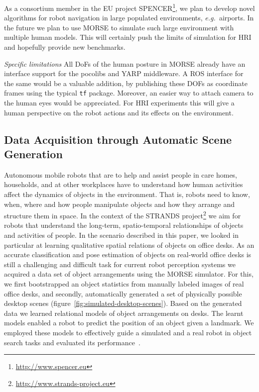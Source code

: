 \documentclass{llncs}
\newcommand{\eg}{{\textit{e.g.~}}}
\begin{document}
As a consortium member in the EU project
SPENCER\footnote{\url{http://www.spencer.eu}}, we plan to develop novel
algorithms for robot navigation in large populated environments, \eg airports.
In the future we plan to use MORSE to simulate such large environment with
multiple human models. This will certainly push the limits of simulation for HRI
and hopefully provide new benchmarks.

\emph{Specific limitations} All DoFs of the human posture in MORSE already have an
interface support for the {\sc pocolibs} and YARP middleware. A ROS interface
for the same would be a valuable addition, by publishing these DOFs
as coordinate frames using the typical {\tt tf} package. Moreover, an easier
way to attach camera to the human eyes would be appreciated. For HRI experiments
this will give a human perspective on the robot actions and its effects on the
environment.


\subsection{Data Acquisition through Automatic Scene Generation}
\label{sc:generation}

Autonomous mobile robots that are to help and assist people in care homes,
households, and at other workplaces have to understand how human activities
affect the dynamics of objects in the environment. That is, robots need to know,
when, where and how people manipulate objects and how they arrange and structure
them in space. In the context of the STRANDS
project\footnote{\url{http://www.strands-project.eu}} we aim for robots that
understand the long-term, spatio-temporal relationships of objects and
activities of people. In the scenario described in this paper, we looked in
particular at learning qualitative spatial relations of objects on office desks.
As an accurate classification and pose estimation of objects on real-world
office desks is still a challenging and difficult task for current robot
perception systems we acquired a data set of object arrangements using the MORSE
simulator. For this, we first bootstrapped an object statistics from manually
labeled images of real office desks, and secondly, automatically generated a set
of physically possible desktop scenes
(figure~\ref{fig:simulated-desktop-scenes}). Based on the generated data we
learned relational models of object arrangements on desks. The learnt models
enabled a robot to predict the position of an object given a landmark. We
employed these models to effectively guide a simulated and a real robot in
object search tasks and evaluated its performance~\cite{kunze14indirect}.
\end{document}
